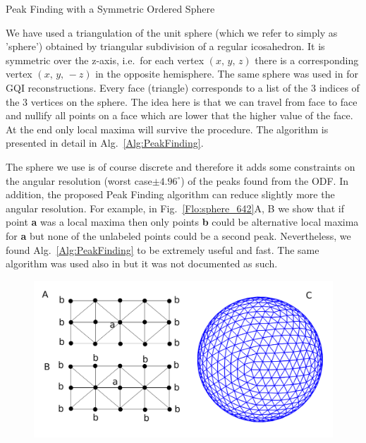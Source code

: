 \documentclass{bioinfo}
\begin{document}
\begin{methods}
\begin{algorithm}
\caption{Peak Finding with a Symmetric Ordered Sphere}

\label{Alg:PeakFinding}
\end{algorithm}


We have used a triangulation of the unit sphere (which we refer to
simply as 'sphere') obtained by triangular subdivision of a regular
icosahedron. It is symmetric over the z-axis, i.e.~for each vertex
$(x,\, y,\, z)$ there is a corresponding vertex $(x,\, y,\,-z)$
in the opposite hemisphere. The same sphere was used in \citet{Yeh2010}
for GQI reconstructions. Every face (triangle) corresponds to a list
of the $3$ indices of the $3$ vertices on the sphere. The idea here
is that we can travel from face to face and nullify all points on
a face which are lower that the higher value of the face. At the end
only local maxima will survive the procedure. The algorithm is presented
in detail in Alg.~\ref{Alg:PeakFinding}.

The sphere we use is of course discrete and therefore it adds some
constraints on the angular resolution (worst case$\pm4.96^{\circ}$)
of the peaks found from the ODF. In addition, the proposed Peak Finding
algorithm can reduce slightly more the angular resolution. For example,
in Fig.~\ref{Flo:sphere_642}A, B we show that if point \textbf{a}
was a local maxima then only points \textbf{b} could be alternative
local maxima for \textbf{a} but none of the unlabeled points could
be a second peak. Nevertheless, we found Alg.~\ref{Alg:PeakFinding}
to be extremely useful and fast. The same algorithm was used also
in \citet{Yeh2010} but it was not documented as such.

%
\begin{figure}
\begin{centering}
\includegraphics[scale=0.6]{figures/peak_finding_sphere}
\par\end{centering}


\end{figure}
\end{methods}
\end{document}
